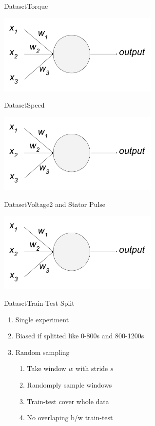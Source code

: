 \documentclass[handout]{beamer}
\begin{document}
\begin{frame}{Dataset}{Torque}
\begin{center}
  \includegraphics[width=0.8\linewidth, height=4cm]{images/perceptron}
\end{center}
\end{frame}

\begin{frame}{Dataset}{Speed}
\begin{center}
  \includegraphics[width=0.8\linewidth, height=4cm]{images/perceptron}
\end{center}
\end{frame}

\begin{frame}{Dataset}{Voltage2 and Stator Pulse}
\begin{center}
  \includegraphics[width=0.8\linewidth, height=4cm]{images/perceptron}
\end{center}
\end{frame}

\begin{frame}{Dataset}{Train-Test Split}
  \begin{enumerate}
    \item Single experiment
    \item Biased if splitted like 0-800s and 800-1200s
    \item Random sampling
      \begin{enumerate}
        \item Take window $w$ with stride $s$
        \item Randomply sample windows
        \item Train-test cover whole data
        \item No overlaping b/w train-test
      \end{enumerate}
  \end{enumerate}
\end{frame}
\end{document}
